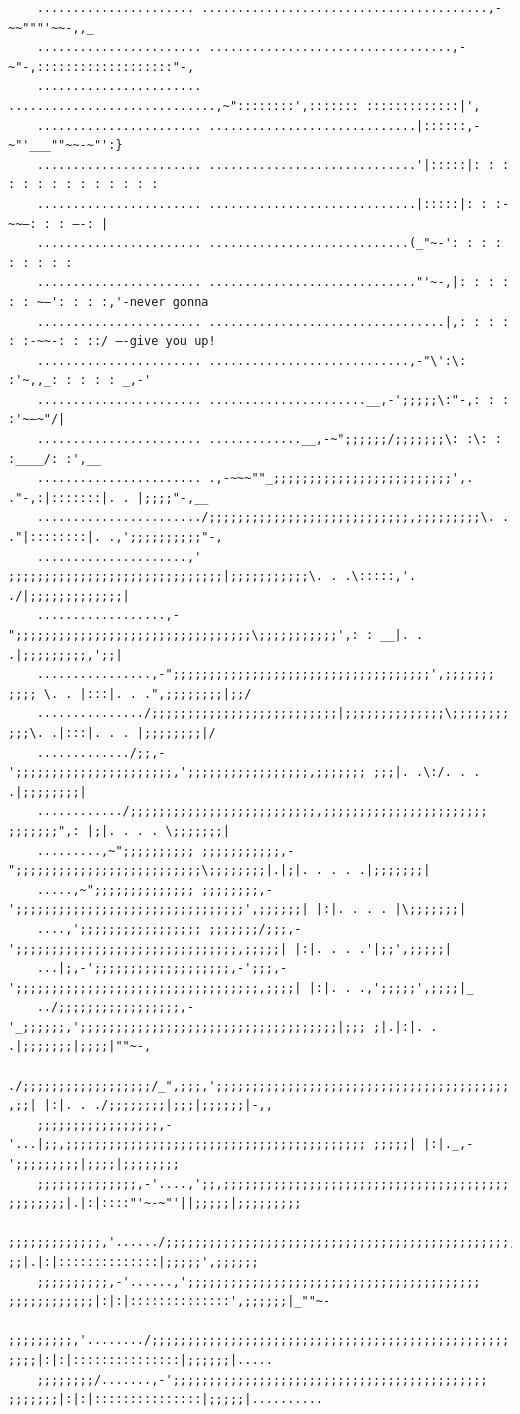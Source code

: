 \documentclass[10pt]{article}
\begin{document}
	\begin{verbatim}
	...................... ........................................,-~~"""'~~-,,_
	....................... ..................................,-~"-,:::::::::::::::::::"-,
	....................... .............................,~"::::::::',::::::: :::::::::::::|',
	....................... .............................|::::::,-~"'___""~~-~"':}
	....................... .............................'|:::::|: : : : : : : : : : : : : :
	....................... .............................|:::::|: : :-~~—: : : —-: |
	....................... ............................(_"~-': : : : : : : : :
	....................... ............................."'~-,|: : : : : : ~—': : : :,'-never gonna
	....................... .................................|,: : : : : :-~~-: : ::/ —-give you up!
	....................... ............................,-"\':\: :'~,,_: : : : : _,-'
	....................... ......................__,-';;;;;\:"-,: : : :'~—~"/|
	....................... .............__,-~";;;;;;/;;;;;;;\: :\: : :____/: :',__
	....................... .,-~~~""_;;;;;;;;;;;;;;;;;;;;;;;;;',. ."-,:|:::::::|. . |;;;;"-,__
	......................./;;;;;;;;;;;;;;;;;;;;;;;;;;;;,;;;;;;;;;\. . ."|::::::::|. .,';;;;;;;;;;"-,
	.....................,' ;;;;;;;;;;;;;;;;;;;;;;;;;;;;;;|;;;;;;;;;;;\. . .\:::::,'. ./|;;;;;;;;;;;;;|
	..................,-";;;;;;;;;;;;;;;;;;;;;;;;;;;;;;;;;\;;;;;;;;;;;',: : __|. . .|;;;;;;;;;,';;|
	................,-";;;;;;;;;;;;;;;;;;;;;;;;;;;;;;;;;;;;',;;;;;;; ;;;; \. . |:::|. . .",;;;;;;;;|;;/
	.............../;;;;;;;;;;;;;;;;;;;;;;;;;;|;;;;;;;;;;;;;;\;;;;;;;; ;;;\. .|:::|. . . |;;;;;;;;|/
	............./;;,-';;;;;;;;;;;;;;;;;;;;;;,';;;;;;;;;;;;;;;;;,;;;;;;; ;;;|. .\:/. . . .|;;;;;;;;|
	............/;;;;;;;;;;;;;;;;;;;;;;;;;;,;;;;;;;;;;;;;;;;;;;;;;; ;;;;;;;",: |;|. . . . \;;;;;;;|
	.........,~";;;;;;;;;; ;;;;;;;;;;;,-";;;;;;;;;;;;;;;;;;;;;;;;;;\;;;;;;;;|.|;|. . . . .|;;;;;;;|
	.....,~";;;;;;;;;;;;;; ;;;;;;;;,-';;;;;;;;;;;;;;;;;;;;;;;;;;;;;;;;',;;;;;;| |:|. . . . |\;;;;;;;|
	....,';;;;;;;;;;;;;;;;; ;;;;;;;/;;;,-';;;;;;;;;;;;;;;;;;;;;;;;;;;;;;;,;;;;;| |:|. . . .'|;;',;;;;;|
	...|;,-';;;;;;;;;;;;;;;;;;;,-';;;,-';;;;;;;;;;;;;;;;;;;;;;;;;;;;;;;;;;,;;;;| |:|. . .,';;;;;',;;;;|_
	../;;;;;;;;;;;;;;;;;,-'_;;;;;;,';;;;;;;;;;;;;;;;;;;;;;;;;;;;;;;;;;;;|;;; ;|.|:|. . .|;;;;;;;|;;;;|""~-,
	./;;;;;;;;;;;;;;;;;;/_",;;;,';;;;;;;;;;;;;;;;;;;;;;;;;;;;;;;;;;;;;;;;; ,;;| |:|. . ./;;;;;;;;|;;;|;;;;;;|-,,
	;;;;;;;;;;;;;;;;;,-'...|;;,;;;;;;;;;;;;;;;;;;;;;;;;;;;;;;;;;;;;;;;;;; ;;;;;| |:|._,-';;;;;;;;;|;;;;|;;;;;;;;
	;;;;;;;;;;;;;;,-'....,';;,;;;;;;;;;;;;;;;;;;;;;;;;;;;;;;;;;;;;;;;; ;;;;;;;;|.|:|::::"'~-~"'||;;;;;|;;;;;;;;;
	;;;;;;;;;;;;;,'....../;;;;;;;;;;;;;;;;;;;;;;;;;;;;;;;;;;;;;;;;;;;;;;;;;; ;;|.|:|::::::::::::::|;;;;;',;;;;;;
	;;;;;;;;;;,-'......,';;;;;;;;;;;;;;;;;;;;;;;;;;;;;;;;;;;;;;;;; ;;;;;;;;;;;;|:|:|::::::::::::::',;;;;;;|_""~-
	;;;;;;;;;,'......../;;;;;;;;;;;;;;;;;;;;;;;;;;;;;;;;;;;;;;;;;;;;;;;;;; ;;;;|:|:|:::::::::::::::|;;;;;;|.....
	;;;;;;;;/.......,-';;;;;;;;;;;;;;;;;;;;;;;;;;;;;;;;;;;;;;;;;;;; ;;;;;;;|:|:|:::::::::::::::|;;;;;|..........
	\end{verbatim}
\end{document}
